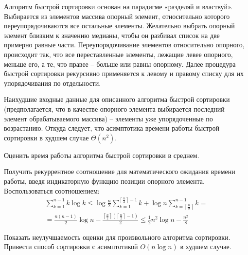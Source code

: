 \begin{problem}
\noindent Алгоритм быстрой сортировки основан на парадигме «разделяй и властвуй». Выбирается из элементов массива опорный элемент, относительно которого переупорядочиваются все остальные элементы. Желательно выбрать опорный элемент близким к значению медианы, чтобы он разбивал список на две примерно равные части. Переупорядочивание элементов относительно опорного, происходит так, что все переставленные элементы, лежащие левее опорного, меньше его, а те, что правее -- больше или равны опорному. Далее процедура быстрой сортировки рекурсивно применяется к левому и правому списку для их упорядочивания по отдельности.

Наихудшие входные данные для описанного алгоритма быстрой сортировки (предполагается, что в качестве опорного элемента выбирается последний элемент обрабатываемого массива) -- элементы уже упорядоченные по возрастанию. 
Откуда следует, что асимптотика времени работы быстрой сортировки в худшем случае $\Theta (n^{2} )$.

Оценить время работы алгоритма быстрой сортировки в среднем. 

\begin{ordre}
Получить рекуррентное соотношение для математического ожидания времени работы, введя индикаторную функцию позиции опорного элемента. 
Воспользоваться соотношением:
\[\begin{array}{l} {\sum _{k=1}^{n-1}k\log k \le \log \frac{n}{2} \sum _{k=1}^{\left\lceil \frac{n}{2} \right\rceil -1}k +\log n\sum _{k=\left\lceil \frac{n}{2} \right\rceil }^{n-1}k =} \\ {=\frac{n(n-1)}{2} \log n-\frac{\left\lceil \frac{n}{2} \right\rceil \left(\left\lceil \frac{n}{2} \right\rceil -1\right)}{2} \le \frac{1}{2} n^{2} \log n-\frac{n^{2} }{8} } \end{array}\] 
 
\end{ordre}

Показать неулучшаемость оценки для произвольного алгоритма сортировки. Привести способ сортировки с асимптотикой $O(n \log n)$ в худшем случае.

\end{problem}


